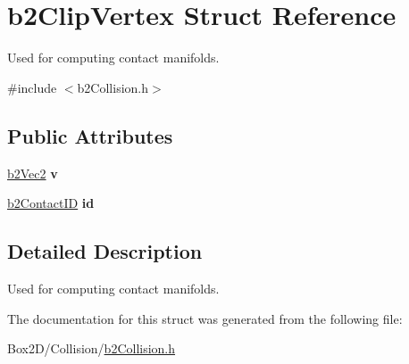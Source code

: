 \hypertarget{structb2_clip_vertex}{}\section{b2\+Clip\+Vertex Struct Reference}
\label{structb2_clip_vertex}


Used for computing contact manifolds.  




{\ttfamily \#include $<$b2\+Collision.\+h$>$}

\subsection*{Public Attributes}
\begin{DoxyCompactItemize}
\item 
\mbox{\label{structb2_clip_vertex_a6c8d8e4c0667755d5295a9c0d91d5b87}} 
\hyperlink{structb2_vec2}{b2\+Vec2} {\bfseries v}
\item 
\mbox{\label{structb2_clip_vertex_ac0f6d48eafc40a665bc18d4aa821689d}} 
\hyperlink{unionb2_contact_i_d}{b2\+Contact\+ID} {\bfseries id}
\end{DoxyCompactItemize}


\subsection{Detailed Description}
Used for computing contact manifolds. 

The documentation for this struct was generated from the following file\+:\begin{DoxyCompactItemize}
\item 
Box2\+D/\+Collision/\hyperlink{b2_collision_8h}{b2\+Collision.\+h}\end{DoxyCompactItemize}
